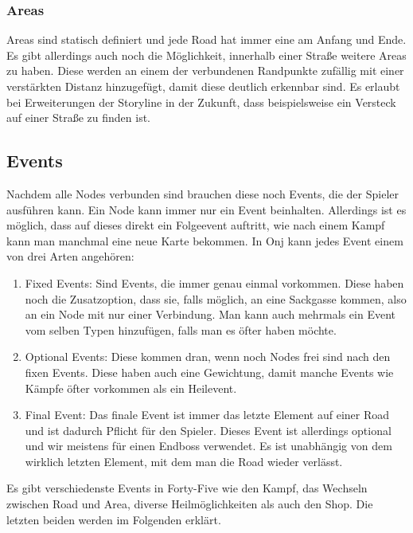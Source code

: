 \subsubsection{Areas}\label{subsubsec:ares}
Areas sind statisch definiert und jede Road hat immer eine am Anfang und Ende.
Es gibt allerdings auch noch die Möglichkeit, innerhalb einer Straße weitere Areas zu haben.
Diese werden an einem der verbundenen Randpunkte zufällig mit einer verstärkten Distanz hinzugefügt, damit diese deutlich erkennbar sind.
Es erlaubt bei Erweiterungen der Storyline in der Zukunft, dass beispielsweise ein Versteck auf einer Straße zu finden ist.


\subsection{Events}\label{subsec:events}
Nachdem alle Nodes verbunden sind brauchen diese noch Events, die der Spieler ausführen kann.
Ein Node kann immer nur ein Event beinhalten.
Allerdings ist es möglich, dass auf dieses direkt ein Folgeevent auftritt, wie \zB nach einem Kampf kann man manchmal eine neue Karte bekommen.
In Onj kann jedes Event einem von drei Arten angehören:

\begin{enumerate}
    \item Fixed Events: Sind Events, die immer genau einmal vorkommen.
    Diese haben noch die Zusatzoption, dass sie, falls möglich, an eine Sackgasse kommen, also an ein Node mit nur einer Verbindung.
    Man kann auch mehrmals ein Event vom selben Typen hinzufügen, falls man es öfter haben möchte.
    \item Optional Events: Diese kommen dran, wenn noch Nodes frei sind nach den fixen Events.
    Diese haben auch eine Gewichtung, damit manche Events wie Kämpfe öfter vorkommen als \zB ein Heilevent.
    \item Final Event: Das finale Event ist immer das letzte Element auf einer Road und ist dadurch Pflicht für den Spieler.
    Dieses Event ist allerdings optional und wir meistens für einen Endboss verwendet.
    Es ist unabhängig von dem wirklich letzten Element, mit dem man die Road wieder verlässt.
\end{enumerate}

Es gibt verschiedenste Events in Forty-Five wie den Kampf, das Wechseln zwischen Road und Area, diverse Heilmöglichkeiten als auch den Shop.
Die letzten beiden werden im Folgenden erklärt.

